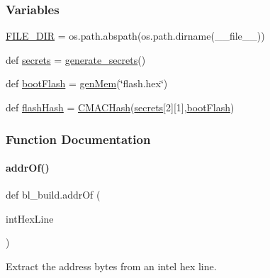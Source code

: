 \subsubsection*{Variables}
\begin{DoxyCompactItemize}
\item 
\hyperlink{namespacebl__build_a089c1667c30c72cb05807dd8157b9ff9}{F\+I\+L\+E\+\_\+\+D\+IR} = os.\+path.\+abspath(os.\+path.\+dirname(\+\_\+\+\_\+file\+\_\+\+\_\+))
\item 
def \hyperlink{namespacebl__build_a7ef58b6350bb8f1ea4b81d24cac72a55}{secrets} = \hyperlink{namespacebl__build_a3311e245be558d39e0edf14ed88da1df}{generate\+\_\+secrets}()
\item 
def \hyperlink{namespacebl__build_a25673c001dbceb6755931c1b27cb1bb2}{boot\+Flash} = \hyperlink{namespacebl__build_a8dc8ae3d67a3c82b7c54bc26252467bd}{gen\+Mem}(\char`\"{}flash.\+hex\char`\"{})
\item 
def \hyperlink{namespacebl__build_ab62730e5e3b453486f9cbb5630497604}{flash\+Hash} = \hyperlink{namespacebl__build_a097a5019a83d65ad61254db9a76624eb}{C\+M\+A\+C\+Hash}(\hyperlink{namespacebl__build_a7ef58b6350bb8f1ea4b81d24cac72a55}{secrets}\mbox{[}2\mbox{]}\mbox{[}1\mbox{]},\hyperlink{namespacebl__build_a25673c001dbceb6755931c1b27cb1bb2}{boot\+Flash})
\end{DoxyCompactItemize}


\subsubsection{Function Documentation}
\mbox{\label{namespacebl__build_ad77bcbb2ba1cd1338b437a74bf2e995c}} 
\paragraph{\texorpdfstring{addr\+Of()}{addrOf()}}
{\footnotesize\ttfamily def bl\+\_\+build.\+addr\+Of (\begin{DoxyParamCaption}\item[{}]{int\+Hex\+Line }\end{DoxyParamCaption})}

\begin{DoxyVerb}Extract the address bytes from an intel hex line.
\end{DoxyVerb}
 \mbox{\label{namespacebl__build_a18e5476f014231406705f66d9aac77c2}} 
